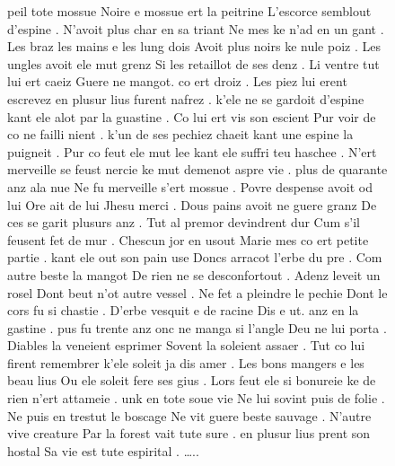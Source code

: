 \documentclass[
  letterpaper,
  DIV=11,
  numbers=noendperiod,
  oneside]{scrreprt}
\begin{document}
\begin{figure}
peil tote mossue Noire e mossue ert la peitrine L'escorce semblout
d'espine . N'avoit plus char en sa triant Ne mes ke n'ad en un gant .
Les braz les mains e les lung dois Avoit plus noirs ke nule poiz . Les
ungles avoit ele mut grenz Si les retaillot de ses denz . Li ventre tut
lui ert caeiz Guere ne mangot. co ert droiz . Les piez lui erent
escrevez en plusur lius furent nafrez . k'ele ne se gardoit d'espine
kant ele alot par la guastine . Co lui ert vis son escient Pur voir de
co ne failli nient . k'un de ses pechiez chaeit kant une espine la
puigneit . Pur co feut ele mut lee kant ele suffri teu haschee . N'ert
merveille se feust nercie ke mut demenot aspre vie . plus de quarante
anz ala nue Ne fu merveille s'ert mossue . Povre despense avoit od lui
Ore ait de lui Jhesu merci . Dous pains avoit ne guere granz De ces se
garit plusurs anz . Tut al premor devindrent dur Cum s'il feusent fet de
mur . Chescun jor en usout Marie mes co ert petite partie . kant ele out
son pain use Doncs arracot l'erbe du pre . Com autre beste la mangot De
rien ne se desconfortout . Adenz leveit un rosel Dont beut n'ot autre
vessel . Ne fet a pleindre le pechie Dont le cors fu si chastie . D'erbe
vesquit e de racine Dis e ut. anz en la gastine . pus fu trente anz onc
ne manga si l'angle Deu ne lui porta . Diables la veneient esprimer
Sovent la soleient assaer . Tut co lui firent remembrer k'ele soleit ja
dis amer . Les bons mangers e les beau lius Ou ele soleit fere ses gius
. Lors feut ele si bonureie ke de rien n'ert attameie . unk en tote soue
vie Ne lui sovint puis de folie . Ne puis en trestut le boscage Ne vit
guere beste sauvage . N'autre vive creature Par la forest vait tute sure
. en plusur lius prent son hostal Sa vie est tute espirital . \ldots..


\end{figure}
\end{document}

